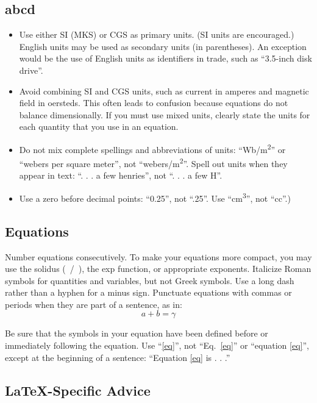 \documentclass[conference]{IEEEtran}
\begin{document}
\subsection{abcd}
\begin{itemize}
\item Use either SI (MKS) or CGS as primary units. (SI units are encouraged.) English units may be used as secondary units (in parentheses). An exception would be the use of English units as identifiers in trade, such as ``3.5-inch disk drive''.
\item Avoid combining SI and CGS units, such as current in amperes and magnetic field in oersteds. This often leads to confusion because equations do not balance dimensionally. If you must use mixed units, clearly state the units for each quantity that you use in an equation.
\item Do not mix complete spellings and abbreviations of units: ``Wb/m\textsuperscript{2}'' or ``webers per square meter'', not ``webers/m\textsuperscript{2}''. Spell out units when they appear in text: ``. . . a few henries'', not ``. . . a few H''.
\item Use a zero before decimal points: ``0.25'', not ``.25''. Use ``cm\textsuperscript{3}'', not ``cc''.)
\end{itemize}

\subsection{Equations}
Number equations consecutively. To make your 
equations more compact, you may use the solidus (~/~), the exp function, or 
appropriate exponents. Italicize Roman symbols for quantities and variables, 
but not Greek symbols. Use a long dash rather than a hyphen for a minus 
sign. Punctuate equations with commas or periods when they are part of a 
sentence, as in:
\begin{equation}
a+b=\gamma\label{eq}
\end{equation}

Be sure that the 
symbols in your equation have been defined before or immediately following 
the equation. Use ``\eqref{eq}'', not ``Eq.~\eqref{eq}'' or ``equation \eqref{eq}'', except at 
the beginning of a sentence: ``Equation \eqref{eq} is . . .''

\subsection{\LaTeX-Specific Advice}
\end{document}
